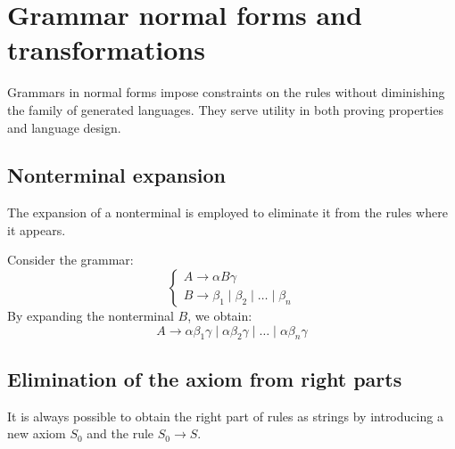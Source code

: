 \section{Grammar normal forms and transformations}

Grammars in normal forms impose constraints on the rules without diminishing the family of generated languages. 
They serve utility in both proving properties and language design.

\subsection{Nonterminal expansion}
The expansion of a nonterminal is employed to eliminate it from the rules where it appears.
\begin{example}
    Consider the grammar: 
    \[\begin{cases}
        A \rightarrow \alpha B \gamma \\
        B \rightarrow \beta_1\mid \beta_2\mid \dots\mid \beta_n
    \end{cases}\]
    By expanding the nonterminal $B$, we obtain:
    \[A \rightarrow \alpha\beta_1\gamma\mid \alpha\beta_2\gamma\mid \dots\mid \alpha\beta_n\gamma\]
\end{example}

\subsection{Elimination of the axiom from right parts}
It is always possible to obtain the right part of rules as strings by introducing a new axiom $S_0$ and the rule $S_0 \rightarrow S$.

